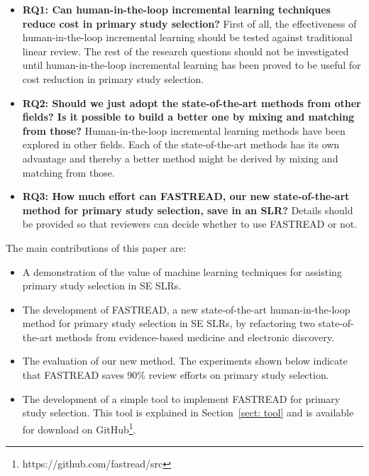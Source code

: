 \documentclass{svjour3}
\theoremstyle{break}
\begin{document}
\begin{itemize}


\item
{\bf RQ1: Can human-in-the-loop incremental learning techniques reduce cost in primary study selection?} First of all, the effectiveness of human-in-the-loop incremental learning should be tested against traditional linear review. The rest of the research questions should not be investigated until human-in-the-loop incremental learning has been proved to be useful for cost reduction in primary study selection.

\item
{\bf RQ2: Should we just adopt the state-of-the-art methods from other fields? Is it possible to build a better one by mixing and matching from those?} Human-in-the-loop incremental learning methods have been explored in other fields. Each of the state-of-the-art methods has its own advantage and thereby a better method might be derived by mixing and matching from those. 

\item
{\bf RQ3: How much effort can FASTREAD, our new state-of-the-art method for primary study selection, save in an SLR?} Details should be provided so that reviewers can decide whether to use FASTREAD or not.


\end{itemize}
The main contributions of this paper are:
\begin{itemize}
\item
  A demonstration of the value of  machine learning techniques for assisting primary study selection in SE SLRs.
\item
  The development of FASTREAD, a new state-of-the-art human-in-the-loop method for primary study selection in SE SLRs, by refactoring two state-of-the-art methods
  from evidence-based medicine and electronic discovery.
  
\item
  The evaluation of our new method.
  The experiments shown below indicate that FASTREAD
  saves 90\% review efforts on primary study selection.
\item The development of a simple tool to implement FASTREAD for primary study selection.
  This tool is explained in Section~\ref{sect: tool} and is
  available for download on GitHub\footnote{https://github.com/fastread/src}. 
\end{itemize}
\end{document}
